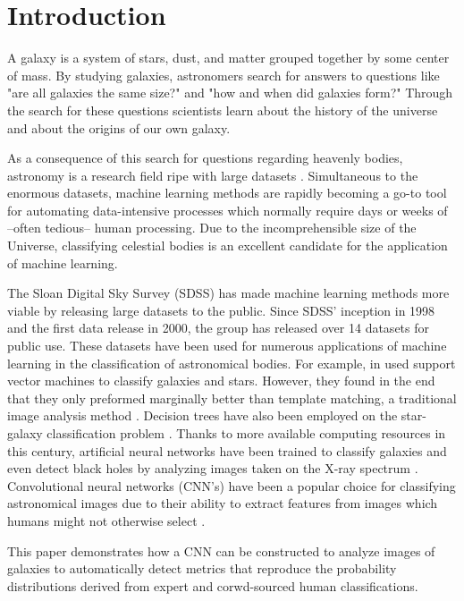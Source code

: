 \section{Introduction}

A galaxy is a system of stars, dust, and matter grouped together by some center of mass. By studying galaxies, astronomers search for answers to questions like "are all galaxies the same size?" and "how and when did galaxies form?" Through the search for these questions scientists learn about the history of the universe and about the origins of our own galaxy.


As a consequence of this search for questions regarding heavenly bodies, astronomy is a research field ripe with large datasets \cite{microsoft-galaxies}. Simultaneous to the enormous datasets, machine learning methods are rapidly becoming a go-to tool for automating data-intensive processes which normally require days or weeks of --often tedious-- human processing. Due to the incomprehensible size of the Universe, classifying celestial bodies is an excellent candidate for the application of machine learning.

The Sloan Digital Sky Survey (SDSS) has made machine learning methods more viable by releasing large datasets to the public. Since SDSS' inception in 1998 and the first data release in 2000, the group has released over 14 datasets for public use. These datasets have been used for numerous applications of machine learning in the classification of astronomical bodies. For example, \citeauthor{svn-galaxy} in \citeyear{svn-galaxy} used support vector machines to classify galaxies and stars. However, they found in the end that they only preformed marginally better than template matching, a traditional image analysis method \cite{svn-galaxy}. Decision trees have also been employed on the star-galaxy classification problem \cite{ball-decision-trees}. Thanks to more available computing resources in this century, artificial neural networks have been trained to classify galaxies and even detect black holes by analyzing images taken on the X-ray spectrum \cite{black-holes}. Convolutional neural networks (CNN's) have been a popular choice for classifying astronomical images due to their ability to extract features from images which humans might not otherwise select \cite{cnn-star-galaxy}.

This paper demonstrates how a CNN can be constructed to analyze images of galaxies to automatically detect metrics that reproduce the probability distributions derived from expert and corwd-sourced human classifications.

